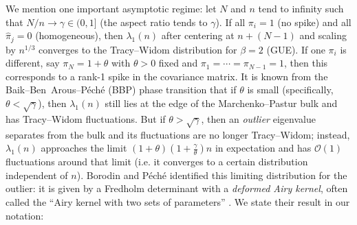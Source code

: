 \documentclass[letterpaper,11pt,oneside,reqno]{article}
\numberwithin{equation}{section}
\theoremstyle{definition}
\begin{document}
We mention one important asymptotic regime: let $N$ and $n$ tend to infinity such that $N/n \to \gamma \in(0,1]$ (the aspect ratio tends to $\gamma$). If all $\pi_i=1$ (no spike) and all $\hat\pi_j=0$ (homogeneous), then $\lambda_1(n)$ after centering at $n+(N-1)$ and scaling by $n^{1/3}$ converges to the Tracy--Widom distribution for $\beta=2$ (GUE). If one $\pi_i$ is different, say $\pi_N=1+\theta$ with $\theta>0$ fixed and $\pi_1=\cdots=\pi_{N-1}=1$, then this corresponds to a rank-1 spike in the covariance matrix. It is known from the Baik--Ben~Arous--P\'ech\'e (BBP) phase transition \cite{BBP2005phase} that if $\theta$ is small (specifically, $\theta < \sqrt{\gamma}$), then $\lambda_1(n)$ still lies at the edge of the Marchenko--Pastur bulk and has Tracy--Widom fluctuations. But if $\theta > \sqrt{\gamma}$, then an \emph{outlier} eigenvalue separates from the bulk and its fluctuations are no longer Tracy--Widom; instead, $\lambda_1(n)$ approaches the limit $(1+\theta)(1+\frac{\gamma}{\theta}) n$ in expectation and has $\mathcal{O}(1)$ fluctuations around that limit (i.e. it converges to a certain distribution independent of $n$). Borodin and P\'ech\'e \cite{BorodinPeche2009} identified this limiting distribution for the outlier: it is given by a Fredholm determinant with a \emph{deformed Airy kernel}, often called the ``Airy kernel with two sets of parameters'' \cite{BBP2005phase}. We state their result in our notation:
\end{document}
